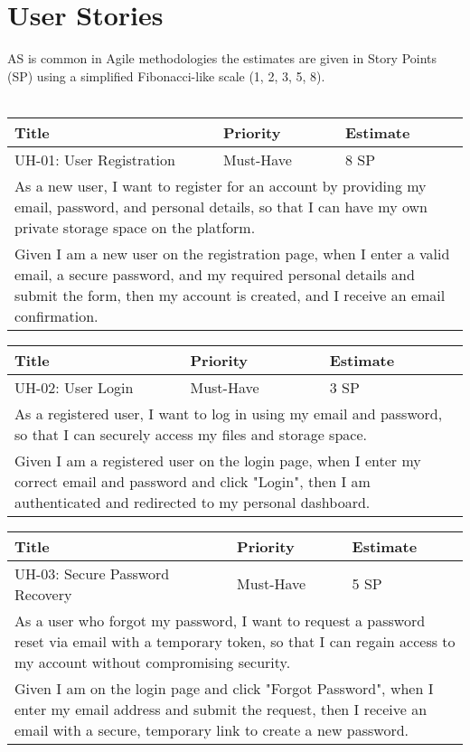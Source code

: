 \section{User Stories}

AS is common in Agile methodologies the estimates are given in Story Points (SP) using a simplified Fibonacci-like scale (1, 2, 3, 5, 8).\\
\\

\begin{tabular}{|p{4cm}|p{5cm}|p{5cm}|}
    \hline
    \textbf{Title} & \textbf{Priority} & \textbf{Estimate} \\
    \hline
    UH-01: User Registration & Must-Have & 8 SP \\
    \hline
    \multicolumn{3}{|p{14cm}|}{As a new user, I want to register for an account by providing my email, password, and personal details, so that I can have my own private storage space on the platform.} \\
    \hline
    \multicolumn{3}{|p{14cm}|}{Given I am a new user on the registration page, when I enter a valid email, a secure password, and my required personal details and submit the form, then my account is created, and I receive an email confirmation.} \\
    \hline
\end{tabular}

\vspace{5mm}
\begin{tabular}{|p{4cm}|p{5cm}|p{5cm}|}
    \hline
    \textbf{Title} & \textbf{Priority} & \textbf{Estimate} \\
    \hline
    UH-02: User Login & Must-Have & 3 SP \\
    \hline
    \multicolumn{3}{|p{14cm}|}{As a registered user, I want to log in using my email and password, so that I can securely access my files and storage space.} \\
    \hline
    \multicolumn{3}{|p{14cm}|}{Given I am a registered user on the login page, when I enter my correct email and password and click "Login", then I am authenticated and redirected to my personal dashboard.} \\
    \hline
\end{tabular}

\vspace{5mm}
\begin{tabular}{|p{4cm}|p{5cm}|p{5cm}|}
    \hline
    \textbf{Title} & \textbf{Priority} & \textbf{Estimate} \\
    \hline
    UH-03: Secure Password Recovery & Must-Have & 5 SP \\
    \hline
    \multicolumn{3}{|p{14cm}|}{As a user who forgot my password, I want to request a password reset via email with a temporary token, so that I can regain access to my account without compromising security.} \\
    \hline
    \multicolumn{3}{|p{14cm}|}{Given I am on the login page and click "Forgot Password", when I enter my email address and submit the request, then I receive an email with a secure, temporary link to create a new password.} \\
    \hline
\end{tabular}

